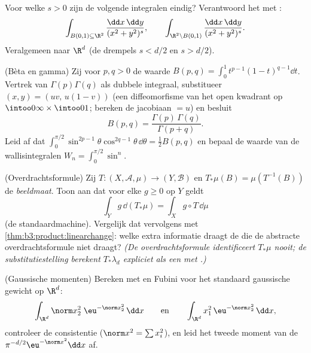 \begin{exercise}[$\star\star$]\label{exo:b3:product:7}
Voor welke $s > 0$ zijn de volgende integralen eindig? Verantwoord
het met :
\[
\int_{B(0,1)\subseteq\R^2}\frac{\dd x\,\dd y}{(x^2 +
y^2)^{s}},
\qquad
\int_{\R^2\setminus B(0,1)}\frac{\dd x\,\dd y}{(x^2 +
y^2)^{s}} .
\]
Veralgemeen naar $\R^d$ (de drempels $s < d/2$ en $s > d/2$).
\end{exercise}

\begin{exercise}[$\star\star\star$]\label{exo:b3:product:8}
(Bèta en gamma) Zij voor $p, q > 0$ de waarde $B(p, q) =
\int_0^1t^{p-1}(1 - t)^{q-1}\dd t$. Vertrek van
$\Gamma(p)\Gamma(q)$ als dubbele integraal, substitueer $(x, y) =
(uv,\, u(1 - v))$ (een diffeomorfisme van het open kwadrant op
$\intoo0\infty\times\intoo01$; bereken de jacobiaan $= u$) en
besluit
\[
B(p, q) = \frac{\Gamma(p)\,\Gamma(q)}{\Gamma(p + q)} .
\]
Leid af dat $\int_0^{\pi/2}\sin^{2p-1}\theta\cos^{2q-1}\theta\,
\dd\theta = \frac12B(p,q)$ en bepaal de waarde van de
wallisintegralen $W_n = \int_0^{\pi/2}\sin^n$.
\end{exercise}

\begin{exercise}[$\star\star$]\label{exo:b3:product:9}
(Overdrachtsformule) Zij $T \colon (X, \mathcal A, \mu) \to (Y,
\mathcal B)$  en $T_*\mu(B) = \mu(T^{-1}(B))$ de
\emph{beeldmaat}. Toon aan dat voor elke 
$g \geq 0$ op $Y$ geldt
\[
\int_Y g\,\dd(T_*\mu) = \int_X g\circ T\,\dd\mu
\]
(de standaardmachine). Vergelijk dat vervolgens met
\cref{thm:b3:product:linearchange}: welke extra informatie draagt
de  die de abstracte
overdrachtsformule niet draagt? \emph{(De overdrachtsformule
identificeert $T_*\mu$ nooit; de substitutiestelling berekent
$T_*\lambda_d$ expliciet als een  met .)}
\end{exercise}

\begin{exercise}[$\star\star\star$]\label{exo:b3:product:10}
(Gaussische momenten) Bereken met  en Fubini voor
het standaard gaussische gewicht op $\R^d$:
\[
\int_{\R^d}\norm x_2^2\;\eu^{-\norm x_2^2}\,\dd x
\qquad\text{en}\qquad
\int_{\R^d}x_1^2\,\eu^{-\norm x^2_2}\,\dd x,
\]
controleer de consistentie ($\norm x^2 = \sum x_i^2$), en leid het
tweede moment van de  $\pi^{-d/2}\eu^{-\norm x^2}\dd x$ af.
\end{exercise}

